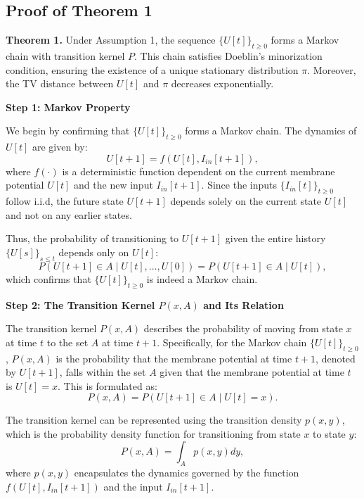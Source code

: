 \subsection{Proof of Theorem 1}
\label{subsec:proof_of_theorem_1}
\textbf{Theorem 1.}
Under Assumption 1, the sequence $\{U[t]\}_{t \ge 0}$ forms a Markov chain with transition kernel $P$. This chain satisfies Doeblin’s minorization condition, ensuring the existence of a unique stationary distribution $\pi$. Moreover, the TV distance between $U[t]$ and $\pi$ decreases exponentially.

\medskip
\noindent
\textbf{Step 1: Markov Property}

We begin by confirming that \( \{U[t]\}_{t \geq 0} \) forms a Markov chain. The dynamics of \( U[t] \) are given by:
\begin{equation}
    U[t+1] = f(U[t], I_{in}[t+1]),
\end{equation}
where \( f(\cdot) \) is a deterministic function dependent on the current membrane potential \( U[t] \) and the new input \( I_{in}[t+1] \). Since the inputs \( \{I_{in}[t]\}_{t \geq 0} \) follow i.i.d, the future state \( U[t+1] \) depends solely on the current state \( U[t] \) and not on any earlier states.

Thus, the probability of transitioning to \( U[t+1] \) given the entire history \( \{U[s]\}_{s \leq t} \) depends only on \( U[t] \):
\begin{equation}
    P(U[t+1] \in A \mid U[t], \dots, U[0]) = P(U[t+1] \in A \mid U[t]),
\end{equation}
which confirms that \( \{U[t]\}_{t \geq 0} \) is indeed a Markov chain.

\medskip
\noindent
\textbf{Step 2: The Transition Kernel \( P(x, A) \) and Its Relation} %

The transition kernel \( P(x, A) \) describes the probability of moving from state \( x \) at time \( t \) to the set \( A \) at time \( t+1 \). Specifically, for the Markov chain \( \{U[t]\}_{t \geq 0} \), \( P(x, A) \) is the probability that the membrane potential at time \( t+1 \), denoted by \( U[t+1] \), falls within the set \( A \) given that the membrane potential at time \( t \) is \( U[t] = x \). This is formulated as:
\begin{equation}
    P(x, A) = P(U[t+1] \in A \mid U[t] = x).
\end{equation}

The transition kernel can be represented using the transition density \( p(x, y) \), which is the probability density function for transitioning from state \( x \) to state \( y \):
\begin{equation}
    P(x, A) = \int_A p(x, y) dy,
\end{equation}
where \( p(x, y) \) encapsulates the dynamics governed by the function \( f(U[t], I_{in}[t+1]) \) and the input \( I_{in}[t+1] \).

